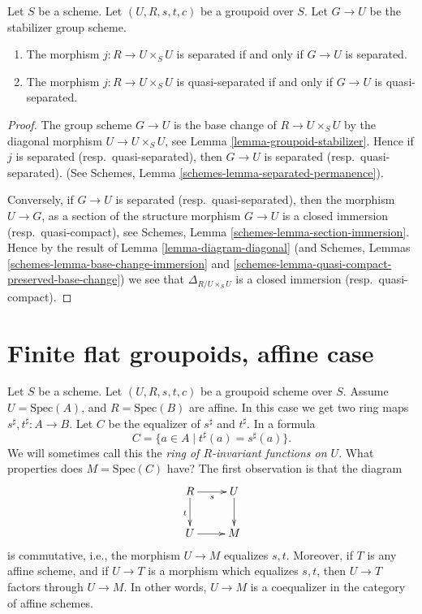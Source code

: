 \begin{lemma}
\label{lemma-diagonal}
Let $S$ be a scheme.
Let $(U, R, s, t, c)$ be a groupoid over $S$.
Let $G \to U$ be the stabilizer group scheme.
\begin{enumerate}
\item The morphism $j : R \to U \times_S U$ is separated if and only if
$G \to U$ is separated.
\item The morphism $j : R \to U \times_S U$ is quasi-separated if and only
if $G \to U$ is quasi-separated.
\end{enumerate}
\end{lemma}

\begin{proof}
The group scheme $G \to U$ is the base change of $R \to U \times_S U$
by the diagonal morphism $U \to U \times_S U$, see
Lemma \ref{lemma-groupoid-stabilizer}. Hence if
$j$ is separated (resp.\ quasi-separated),
then $G \to U$ is separated (resp.\ quasi-separated).
(See Schemes, Lemma
\ref{schemes-lemma-separated-permanence}).

\medskip\noindent
Conversely, if $G \to U$ is separated
(resp.\ quasi-separated), then the morphism $U \to G$, as a section
of the structure morphism $G \to U$ is a closed immersion
(resp.\ quasi-compact), see
Schemes, Lemma \ref{schemes-lemma-section-immersion}.
Hence by the result of Lemma \ref{lemma-diagram-diagonal}
(and Schemes, Lemmas \ref{schemes-lemma-base-change-immersion}
and \ref{schemes-lemma-quasi-compact-preserved-base-change})
we see that $\Delta_{R/U \times_S U}$ is a closed
immersion (resp.\ quasi-compact).
\end{proof}









\section{Finite flat groupoids, affine case}
\label{section-finite-flat}

\noindent
Let $S$ be a scheme.
Let $(U, R, s, t, c)$ be a groupoid scheme over $S$.
Assume $U = \text{Spec}(A)$, and $R = \text{Spec}(B)$ are affine.
In this case we get two ring maps
$s^\sharp, t^\sharp : A \longrightarrow B$.
Let $C$ be the equalizer of $s^\sharp$ and $t^\sharp$. In a formula
\begin{equation}
\label{equation-invariants}
C = \{a \in A \mid t^\sharp(a) = s^\sharp(a) \}.
\end{equation}
We will sometimes call this the {\it ring of $R$-invariant functions on $U$}.
What properties does $M = \text{Spec}(C)$ have? The first observation is
that the diagram
$$
\xymatrix{
R \ar[r]_s \ar[d]_t & U \ar[d] \\
U \ar[r] & M
}
$$
is commutative, i.e., the morphism $U \to M$ equalizes $s, t$.
Moreover, if $T$ is any affine scheme, and if $U \to T$ is
a morphism which equalizes $s, t$, then $U \to T$ factors through $U \to M$.
In other words, $U \to M$ is a coequalizer in the category of affine schemes.

